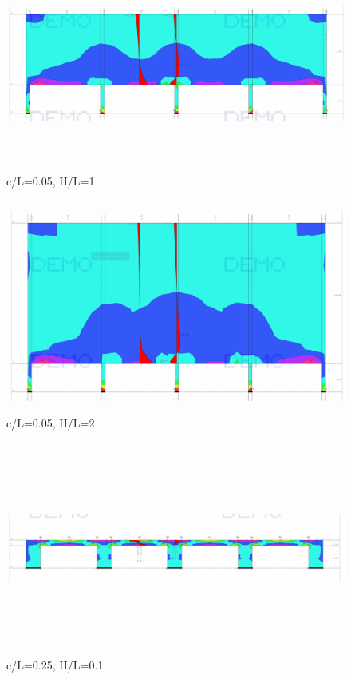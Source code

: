 \documentclass[11pt, a4paper]{article}
\begin{document}
\begin{figure}[H]
	\includegraphics[width=\textwidth, height=7cm]{Slike/C-L_0-05 (1-0).png}
	\caption{c/L=0.05, H/L=1}
\end{figure}

\begin{figure}[H]
	\includegraphics[width=\textwidth, height=7cm]{Slike/C-L_0-05 (2-0).png}
	\caption{c/L=0.05, H/L=2}
\end{figure}

\begin{figure}[H]
	\includegraphics[width=\textwidth, height=7cm]{Slike/C-L_0-25 (0-1).png}
	\caption{c/L=0.25, H/L=0.1}
\end{figure}
\end{document}
